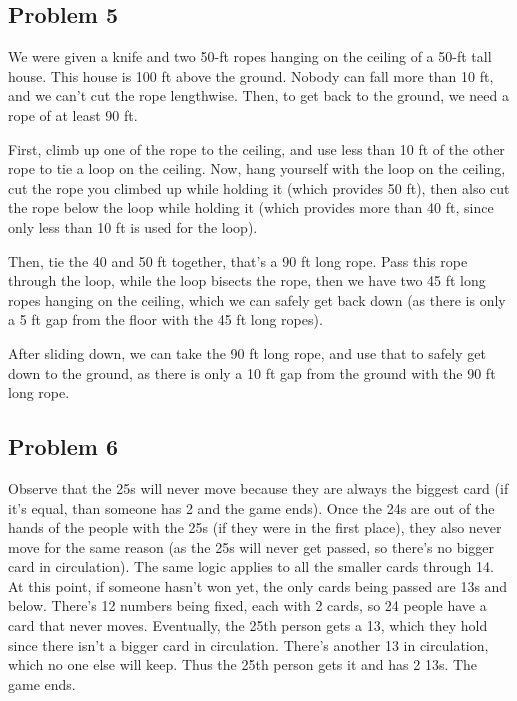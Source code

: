 \documentclass{article}
\begin{document}
\hfill

\subsection{Problem 5}
We were given a knife and two 50-ft ropes hanging on the ceiling of a 50-ft tall house. This house is 100 ft above the ground. Nobody can fall more than 10 ft, 
and we can’t cut the rope lengthwise. Then, to get back to the ground, we need a rope of at least 90 ft.

First, climb up one of the rope to the ceiling, and use less than 10 ft of the other rope to tie a loop on the ceiling. 
Now, hang yourself with the loop on the ceiling, cut the rope you climbed up while holding it (which provides 50 ft), then also cut the rope below the loop while holding it 
(which provides more than 40 ft, since only less than 10 ft is used for the loop).

Then, tie the 40 and 50 ft together, that’s a 90 ft long rope. Pass this rope through the loop, while the loop bisects the rope, then we have two 45 ft long ropes hanging on the ceiling, 
which we can safely get back down (as there is only a 5 ft gap from the floor with the 45 ft long ropes).

After sliding down, we can take the 90 ft long rope, and use that to safely get down to the ground, as there is only a 10 ft gap from the ground with the 90 ft long rope.


\hfill

\subsection{Problem 6}
Observe that the 25s will never move because they are always the biggest card (if it’s equal, than someone has 2 and the game ends). 
Once the 24s are out of the hands of the people with the 25s (if they were in the first place), they also never move for the same reason (as the 25s will never get passed, so there’s no bigger card in circulation). 
The same logic applies to all the smaller cards through 14. At this point, if someone hasn’t won yet, the only cards being passed are 13s and below. There’s 12 numbers being fixed, 
each with 2 cards, so 24 people have a card that never moves. Eventually, the 25th person gets a 13, which they hold since there isn’t a bigger card in circulation. 
There’s another 13 in circulation, which no one else will keep. Thus the 25th person gets it and has 2 13s. The game ends.


\hfill
\end{document}
